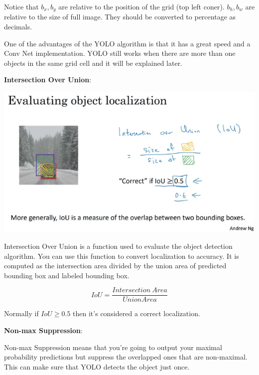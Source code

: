 \documentclass{article}
\begin{document}
\noindent Notice that \(b_{x}, b_{y}\) are relative to the position of the grid (top left coner). \(b_{h}, b_{w}\) are relative to the size of full image. They should be converted to percentage as decimals.

\bigskip

\noindent One of the advantages of the YOLO algorithm is that it has a great speed and a Conv Net implementation. YOLO still works when there are more than one objects in the same grid cell and it will be explained later.

\bigskip

\noindent \textbf{Intersection Over Union}:

\begin{center}
\includegraphics[scale=0.5]{./images/intersection_over_union.png}
\end{center}

\noindent Intersection Over Union is a function used to evaluate the object detection algorithm. You can use this function to convert localization to accuracy. It is computed as the intersection area divided by the union area of predicted bounding box and labeled bounding box.

\[IoU = \frac{Intersection \ Area}{Union Area}\]

\noindent Normally if \(IoU \geq 0.5\) then it's considered a correct localization.

\bigskip

\noindent \textbf{Non-max Suppression}:

\noindent Non-max Suppression means that you're going to output your maximal probability predictions but suppress the overlapped ones that are non-maximal. This can make sure that YOLO detects the object just once.
\end{document}
